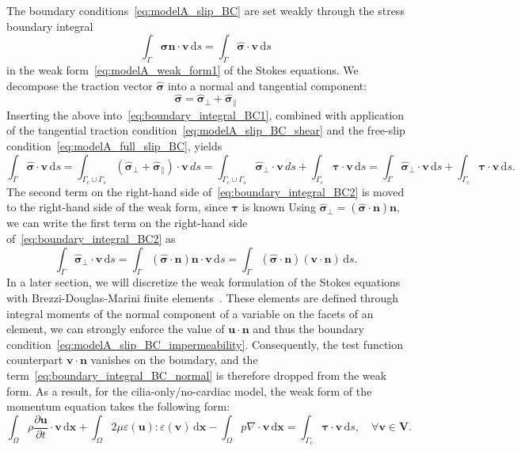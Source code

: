 \documentclass[fleqn]{wlscirep}
\newcommand{\pdifft}[1]{\frac{\partial  #1}{\partial t}}
\newcommand{\intO}[1]{\int_{\Omega}#1 \, \mathrm d\bm{x}}
\newcommand{\intG}[1]{\int_{\Gamma}#1 \, \mathrm ds}
\newcommand{\intGc}[1]{\int_{\Gamma_c}#1 \, \mathrm ds}
\newcommand{\Gs}{\Gamma_{s}}
\newcommand{\Gc}{\Gamma_{c}}
\newcommand{\nn}{\mathbf{n}}
\newcommand{\uu}{\mathbf{u}}
\newcommand{\vv}{\mathbf{v}}
\newcommand{\VV}{\mathbf{V}}
\newcommand{\bsig}{\bm{\sigma}}
\newcommand{\bsigpar}{\hat{\bsig}_{\parallel}}
\newcommand{\bsigperp}{\hat{\bsig}_{\perp}}
\newcommand{\btau}{\bm{\tau}}
\begin{document}
The boundary conditions~\eqref{eq:modelA_slip_BC} are set weakly through the stress boundary integral 
\begin{equation}
    \intG{\bsig\nn\cdot\vv} =  \intG{\hat{\bsig}\cdot\vv}
    \label{eq:boundary_integral_BC1}
\end{equation}
in the weak form~\eqref{eq:modelA_weak_form1} of the Stokes equations.
We decompose the traction vector $\hat{\bsig}$ into a normal and tangential component:
\begin{equation*}
    \hat{\bsig} = \bsigperp + \bsigpar
\end{equation*}
Inserting the above into~\eqref{eq:boundary_integral_BC1},
combined with application of the tangential traction
condition~\eqref{eq:modelA_slip_BC_shear} and the
free-slip condition~\eqref{eq:modelA_full_slip_BC}, yields
\begin{equation}
    \intG{\hat{\bsig}\cdot\vv} = \int_{\Gc\cup\Gs}{(\bsigperp + \bsigpar)\cdot\vv}\, ds = 
    \int_{\Gc\cup\Gs}{\bsigperp\cdot\vv}\, ds
    + \intGc{\btau\cdot\vv} = \intG{\bsigperp\cdot\vv} + \intGc{\btau\cdot\vv}.
    \label{eq:boundary_integral_BC2}
\end{equation}
The second term on the right-hand side of~\eqref{eq:boundary_integral_BC2}
is moved to the right-hand side of the weak form, since $\btau$ is known
 Using $\hat{\bsig}_{\perp} = (\hat{\bsig}\cdot\nn)\nn$,
 we can write the first term on the right-hand side of~\eqref{eq:boundary_integral_BC2} as
\begin{equation}
    \intG{\bsigperp\cdot\vv} = \intG{(\hat{\bsig}\cdot\nn)\nn\cdot\vv} = \intG{(\hat{\bsig}\cdot\nn)(\vv\cdot\nn)}.
    \label{eq:boundary_integral_BC_normal}
\end{equation}
In a later section, we will discretize the weak formulation
of the Stokes equations with Brezzi-Douglas-Marini
finite elements~\cite{Brezzi1985TwoProblems}. These elements are
defined through integral moments of the normal component of a
variable on the facets of an element, we can strongly enforce
the value of $\uu\cdot\nn$ and thus the boundary
condition~\eqref{eq:modelA_slip_BC_impermeability}.
Consequently, the test function counterpart $\vv\cdot\nn$ vanishes
on the boundary, and the term~\eqref{eq:boundary_integral_BC_normal}
is therefore dropped from the weak form. As a result, for the cilia-only/no-cardiac model,
the weak form of the momentum equation takes the following form:
\begin{equation*}
    \intO{\rho\pdifft{\uu}\cdot\vv}
    + \intO{2\mu\varepsilon(\uu) : \varepsilon(\vv)}
    - \intO{p\nabla\cdot\vv} = \intGc{\btau\cdot\vv}, \quad\forall\vv\in\VV.
\end{equation*}
\end{document}
